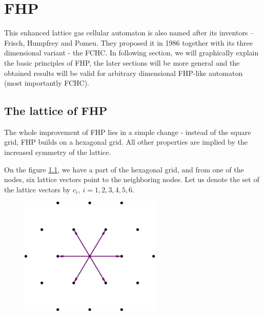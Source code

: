 \chapter{FHP}
This enhanced lattice gas cellular automaton is also named after its inventors -- Frisch, Humpfrey and Pomeu. 
They proposed it in 1986 \cite{fhp} together with its three dimensional variant - the FCHC. 
%
In following section, we will graphically explain the basic principles of FHP, the later sections will be more general and the obtained results will be valid for arbitrary dimensional FHP-like automaton (most importantly FCHC).

\section{The lattice of FHP}
The whole improvement of FHP lies in a simple change - instead of the square grid, FHP builds on a hexagonal grid. 
All other properties are implied by the increased symmetry of the lattice.

On the figure \ref{FHPgrid}, we have a part of the hexagonal grid, and from one of the nodes, six lattice vectors point to the neighboring nodes.
Let us denote the set of the lattice vectors by $c_i,~i=1,2,3,4,5,6$.


\begin{figure}[htbp] \label{FHPgrid}
 \centering
 \includegraphics[width=0.6\textwidth]{./img/fhp_desc}
\end{figure}

